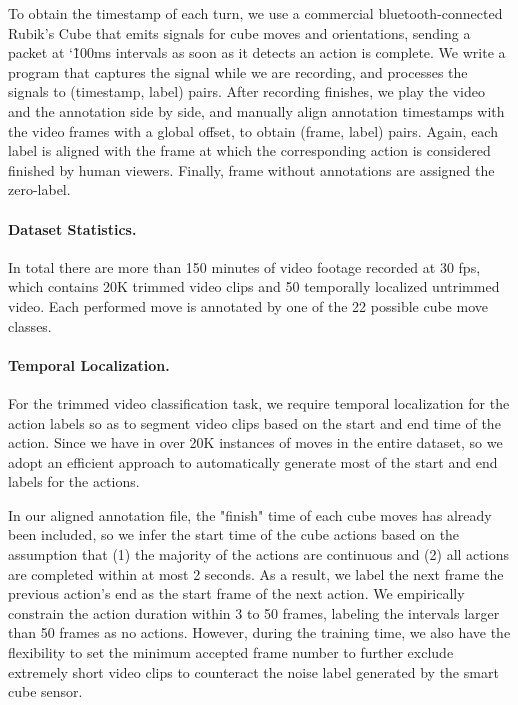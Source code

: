 \documentclass[10pt,twocolumn,letterpaper]{article}
\begin{document}
To obtain the timestamp of each turn, we use a commercial bluetooth-connected Rubik's Cube that emits signals for cube moves and orientations, sending a packet at \char`\~100ms intervals as soon as it detects an action is complete. We write a program that captures the signal while we are recording, and processes the signals to (timestamp, label) pairs. After recording finishes, we play the video and the annotation side by side, and manually align annotation timestamps with the video frames with a global offset, to obtain (frame, label) pairs. Again, each label is aligned with the frame at which the corresponding action is considered finished by human viewers. Finally, frame without annotations are assigned the zero-label.

\paragraph{Dataset Statistics.}
In total there are more than 150 minutes of video footage recorded at 30 fps, which contains 20K trimmed video clips and 50 temporally localized untrimmed video. Each performed move is annotated by one of the 22 possible cube move classes. 

\paragraph{Temporal Localization.} For the trimmed video classification task, we require temporal localization for the action labels so as to segment video clips based on the start and end time of the action. Since we have in over 20K instances of moves in the entire dataset, so we adopt an efficient approach to automatically generate most of the start and end labels for the actions. 

In our aligned annotation file, the "finish" time of each cube moves has already been included, so we infer the start time of the cube actions based on the assumption that (1) the majority of the actions are continuous and (2) all actions are completed within at most 2 seconds. As a result, we label the next frame the previous action's end as the start frame of the next action. We empirically constrain the action duration within 3 to 50 frames, labeling the intervals larger than 50 frames as no actions. However, during the training time, we also have the flexibility to set the minimum accepted frame number to further exclude extremely short video clips to counteract the noise label generated by the smart cube sensor.
\end{document}
